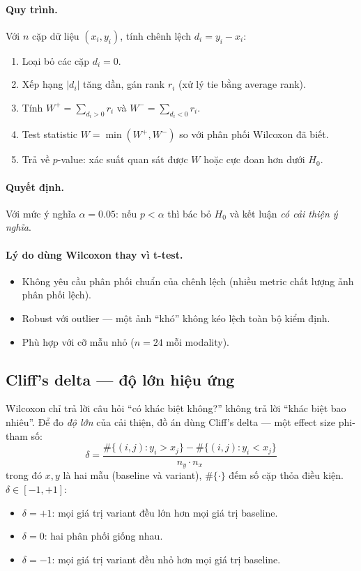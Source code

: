 \paragraph{Quy trình.}
Với $n$ cặp dữ liệu $(x_i, y_i)$, tính chênh lệch $d_i = y_i - x_i$:
\begin{enumerate}\itemsep0pt
    \item Loại bỏ các cặp $d_i = 0$.
    \item Xếp hạng $|d_i|$ tăng dần, gán rank $r_i$ (xử lý tie bằng average rank).
    \item Tính $W^+ = \sum_{d_i > 0} r_i$ và $W^- = \sum_{d_i < 0} r_i$.
    \item Test statistic $W = \min(W^+, W^-)$ so với phân phối Wilcoxon đã biết.
    \item Trả về $p$-value: xác suất quan sát được $W$ hoặc cực đoan hơn dưới $H_0$.
\end{enumerate}

\paragraph{Quyết định.}
Với mức ý nghĩa $\alpha = 0.05$: nếu $p < \alpha$ thì bác bỏ $H_0$ và kết luận \emph{có cải thiện ý nghĩa}.

\paragraph{Lý do dùng Wilcoxon thay vì t-test.}
\begin{itemize}\itemsep0pt
    \item Không yêu cầu phân phối chuẩn của chênh lệch (nhiều metric chất lượng ảnh phân phối lệch).
    \item Robust với outlier --- một ảnh ``khó'' không kéo lệch toàn bộ kiểm định.
    \item Phù hợp với cỡ mẫu nhỏ ($n = 24$ mỗi modality).
\end{itemize}

\subsection{Cliff's delta --- độ lớn hiệu ứng}
\label{ssec:cliff}

Wilcoxon chỉ trả lời câu hỏi ``có khác biệt không?'' không trả lời ``khác biệt bao nhiêu''. Để đo \emph{độ lớn} của cải thiện, đồ án dùng Cliff's delta \cite{cliff1993dominance} --- một effect size phi-tham số:
\begin{equation}
\delta = \frac{\#\{(i, j) : y_i > x_j\} - \#\{(i, j) : y_i < x_j\}}{n_y \cdot n_x}
\end{equation}
trong đó $x, y$ là hai mẫu (baseline và variant), $\#\{\cdot\}$ đếm số cặp thỏa điều kiện. $\delta \in [-1, +1]$:
\begin{itemize}\itemsep0pt
    \item $\delta = +1$: mọi giá trị variant đều lớn hơn mọi giá trị baseline.
    \item $\delta = 0$: hai phân phối giống nhau.
    \item $\delta = -1$: mọi giá trị variant đều nhỏ hơn mọi giá trị baseline.
\end{itemize}

